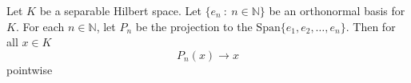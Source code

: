 \begin{remark}
  Let $K$ be a separable Hilbert space. Let $\{ e_n \ : \ n \in
  \mathbb{N} \}$ be an orthonormal basis for $K$. For each $n \in
  \mathbb{N}$, let $P_n$ be the projection to the $\textrm{Span}\{
  e_1 , e_2 , \ldots , e_n \}$. Then for all $ x \in K$ \[
    P_n(x) \to x
  \]
  pointwise
\end{remark}

